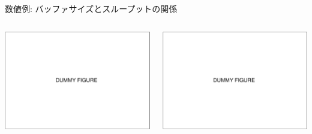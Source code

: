 \documentclass[compress,dvipdfmx,11pt]{beamer}
\begin{document}
\begin{frame}[label={sec:orgb2b22f7}]{数値例: バッファサイズとスループットの関係}
\begin{columns}
\begin{column}{0.5\columnwidth}
\begin{center}
\begin{center}
\includegraphics[width=\columnwidth,height=.7\textheight]{./figure/dummy.eps}
\end{center}
\end{center}
\end{column}

\begin{column}{0.5\columnwidth}
\begin{center}
\begin{center}
\includegraphics[width=\columnwidth,height=.7\textheight]{./figure/dummy.eps}
\end{center}
\end{center}
\end{column}
\end{columns}
\end{frame}
\end{document}
